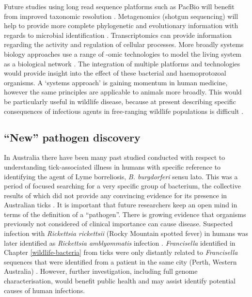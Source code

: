 \documentclass[a4paper, nobind]{templates/ociamthesis}
\begin{document}
Future studies using long read sequence platforms such as PacBio will benefit from improved taxonomic resolution \autocite{jamyLongReadMetabarcoding2020}.
Metagenomics (shotgun sequencing) will help to provide more complete phylogenetic and evolutionary information with regards to microbial identification \autocite{razzautiComparisonTranscriptomeSequencing2015}.
Transcriptomics can provide information regarding the activity and regulation of cellular processes.
More broadly systems biology approaches use a range of -omic technologies to model the living system as a biological network \autocite{eckhardtSystemsApproachInfectious2020}.
The integration of multiple platforms and technologies would provide insight into the effect of these bacterial and haemoprotozoal organisms.
A `systems approach' is gaining momentum in human medicine, however the same principles are applicable to animals more broadly.
This would be particularly useful in wildlife disease, because at present describing specific consequences of infectious agents in free-ranging wildlife populations is difficult \autocite{austenInvestigationMorphologicalDiversity2015,goftonNovelEhrlichiaSpecies2018,northoverIncreasedTrypanosomaSpp2019}.

\hypertarget{new-pathogen-discovery}{%
\subsection{``New'' pathogen discovery}\label{new-pathogen-discovery}}

In Australia there have been many past studied conducted with respect to understanding tick-associated illness in humans with specific reference to identifying the agent of Lyme borreliosis, \emph{B. burgdorferi} sensu lato.
This was a period of focused searching for a very specific group of bacterium, the collective results of which did not provide any convincing evidence for its presence in Australian ticks \autocite{chaladaThereLymelikeDisease2016}.
It is important that future researchers keep an open mind in terms of the definition of a ``pathogen''.
There is growing evidence that organisms previously not considered of clinical importance can cause disease.
Suspected infection with \emph{Rickettsia rickettsii} (Rocky Mountain spotted fever) in humans was later identified as \emph{Rickettsia amblyommatis} infection \autocite{appersonTickBorneDiseasesNorth2008}.
\emph{Francisella} identified in Chapter \ref{wildlife-bacteria} from ticks were only distantly related to \emph{Francisella} sequences that were identified from a patient in the same city (Perth, Western Australia) \autocite{aravena-romanFirstCaseFrancisella2015}. However, further investigation, including full genome characterisation, would benefit public health and may assist identify potential causes of human infections.
\end{document}
